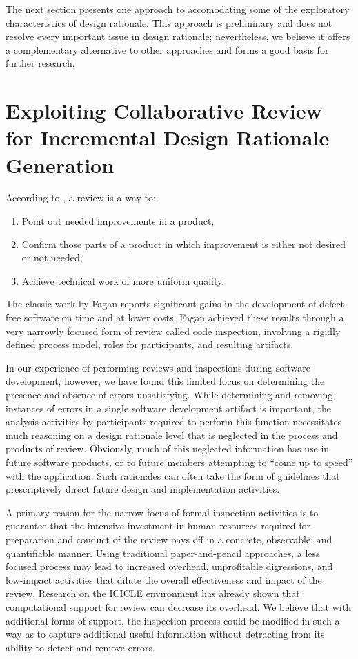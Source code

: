 The next section presents one approach to accomodating some of the
exploratory characteristics of design rationale.  This
approach is preliminary and does not resolve every important issue in
design rationale; nevertheless, we believe it offers a complementary 
alternative to other approaches and forms a good basis for further
research.

\section{Exploiting Collaborative Review for Incremental Design 
Rationale Generation}

According to \cite{Freedman90}, a review is a way to:
\begin{enumerate}
\item Point out needed improvements in a product;
\item Confirm those parts of a product in which improvement is either
not desired or not needed;
\item Achieve technical work of more uniform quality.
\end{enumerate}

The classic work by Fagan \cite{Fagan76,Fagan86} reports significant
gains in the development of defect-free software on time and at lower
costs.  Fagan achieved these results through a very narrowly focused
form of review called code inspection, involving a rigidly defined
process model, roles for participants, and resulting artifacts.

In our experience of performing reviews and inspections during
software development, however, we have found this limited focus on
determining the presence and absence of errors unsatisfying. While
determining and removing instances of errors in a single software
development artifact is important, the analysis activities by
participants required to perform this function necessitates much
reasoning on a design rationale level that is neglected in the process
and products of review.  Obviously, much of this neglected information
has use in future software products, or to future members attempting
to ``come up to speed'' with the application.  Such rationales can
often take the form of guidelines that prescriptively direct future
design and implementation activities.  

A primary reason for the narrow focus of formal inspection activities
is to guarantee that the intensive investment in human resources
required for preparation and conduct of the review pays off in a
concrete, observable, and quantifiable manner.  Using traditional
paper-and-pencil approaches, a less focused process may lead to
increased overhead, unprofitable digressions, and low-impact
activities that dilute the overall effectiveness and impact of the
review. Research on the ICICLE environment \cite{Sembugamoorthy90} has
already shown that computational support for review can decrease its
overhead.  We believe that with additional forms of support, the
inspection process could be modified in such a way as to capture
additional useful information without detracting from its ability to
detect and remove errors.

